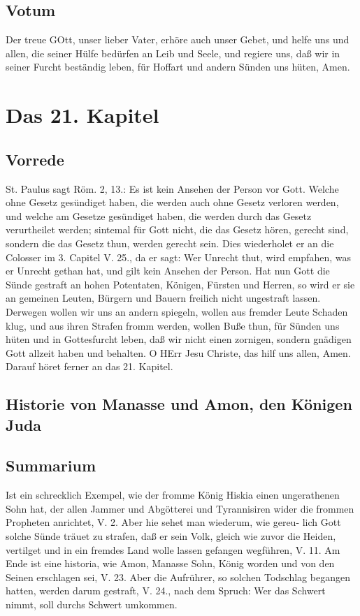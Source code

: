 \section{Votum}

Der treue GOtt, unser lieber Vater, erhöre auch unser Gebet, und helfe uns und allen, die seiner Hülfe bedürfen an Leib und Seele, und regiere uns, daß wir in seiner Furcht beständig leben, für Hoffart und andern Sünden uns hüten, Amen.

\chapter{Das 21. Kapitel}

\section{Vorrede}

St. Paulus sagt Röm. 2, 13.: Es ist kein Ansehen der Person vor Gott. Welche ohne Gesetz gesündiget haben, die werden auch ohne Gesetz verloren werden, und welche am Gesetze gesündiget haben, die werden durch das Gesetz verurtheilet werden; sintemal für Gott nicht, die das Gesetz hören, gerecht sind, sondern die das Gesetz thun, werden gerecht sein. Dies wiederholet er an die Colosser im 3. Capitel V. 25., da er sagt: Wer Unrecht thut, wird empfahen, was er Unrecht gethan hat, und gilt kein Ansehen der Person. Hat nun Gott die Sünde gestraft an hohen Potentaten, Königen, Fürsten und Herren, so wird er sie an gemeinen Leuten, Bürgern und Bauern freilich nicht ungestraft lassen. Derwegen wollen wir uns an andern spiegeln, wollen aus fremder Leute Schaden klug, und aus ihren Strafen fromm werden, wollen Buße thun, für Sünden uns hüten und in Gottesfurcht leben, daß wir nicht einen zornigen, sondern gnädigen Gott allzeit haben und behalten. O HErr Jesu Christe, das hilf uns allen, Amen. Darauf höret ferner an das 21. Kapitel.

\section{Historie von Manasse und Amon, den Königen Juda}

\section{Summarium}

Ist ein schrecklich Exempel, wie der fromme König Hiskia einen ungerathenen Sohn hat, der allen Jammer und Abgötterei und Tyrannisiren wider die frommen Propheten anrichtet, V. 2. Aber hie sehet man wiederum, wie gereu-
lich Gott solche Sünde träuet zu strafen, daß er sein Volk, gleich wie zuvor die Heiden, vertilget und in ein fremdes Land wolle lassen gefangen wegführen, V. 11. Am Ende ist eine historia, wie Amon, Manasse Sohn, König worden und von den Seinen erschlagen sei, V. 23. Aber die Aufrührer, so solchen Todschlag begangen hatten, werden darum gestraft, V. 24., nach dem Spruch: Wer das Schwert nimmt, soll durchs Schwert umkommen.

